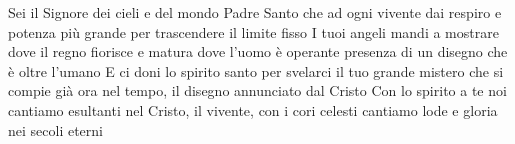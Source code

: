 \beginverse
Sei il Signore dei cieli e del mondo
Padre Santo che ad ogni vivente
dai respiro e potenza più grande
per trascendere il limite fisso
I tuoi angeli mandi a mostrare
dove il regno fiorisce e matura
dove l'uomo è operante presenza
di un disegno che è oltre l'umano
E ci doni lo spirito santo
per svelarci il tuo grande mistero
che si compie già ora nel tempo,
il disegno annunciato dal Cristo
Con lo spirito a te noi cantiamo
esultanti nel Cristo, il vivente,
con i cori celesti cantiamo
lode e gloria nei secoli eterni
\endverse
\endsong
